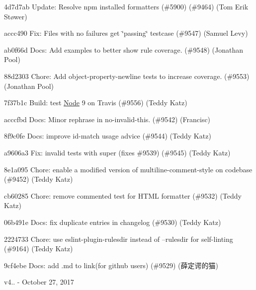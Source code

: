 \begin{DoxyItemize}
\item 4d7d7ab Update\+: Resolve npm installed formatters (\#5900) (\#9464) (Tom Erik Støwer)
\item accc490 Fix\+: Files with no failures get \char`\"{}passing\char`\"{} testcase (\#9547) (Samuel Levy)
\item ab0f66d Docs\+: Add examples to better show rule coverage. (\#9548) (Jonathan Pool)
\item 88d2303 Chore\+: Add object-\/property-\/newline tests to increase coverage. (\#9553) (Jonathan Pool)
\item 7f37b1c Build\+: test \mbox{\hyperlink{class_node}{Node}} 9 on Travis (\#9556) (Teddy Katz)
\item acccfbd Docs\+: Minor rephrase in {\ttfamily no-\/invalid-\/this}. (\#9542) (Francisc)
\item 8f9c0fe Docs\+: improve id-\/match usage advice (\#9544) (Teddy Katz)
\item a9606a3 Fix\+: invalid tests with super (fixes \#9539) (\#9545) (Teddy Katz)
\item 8e1a095 Chore\+: enable a modified version of multiline-\/comment-\/style on codebase (\#9452) (Teddy Katz)
\item cb60285 Chore\+: remove commented test for H\+T\+ML formatter (\#9532) (Teddy Katz)
\item 06b491e Docs\+: fix duplicate entries in changelog (\#9530) (Teddy Katz)
\item 2224733 Chore\+: use eslint-\/plugin-\/rulesdir instead of --rulesdir for self-\/linting (\#9164) (Teddy Katz)
\item 9cf4ebe Docs\+: add .md to link(for github users) (\#9529) (薛定谔的猫)
\end{DoxyItemize}

v4.. -\/ October 27, 2017


